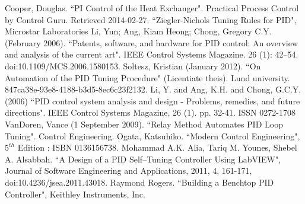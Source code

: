 \begin{thebibliography}{99}
 Cooper, Douglas. ``PI Control of the Heat Exchanger". Practical Process Control by Control Guru. Retrieved 2014-02-27.
 ``Ziegler-Nichols Tuning Rules for PID", Microstar Laboratories
 Li, Yun; Ang, Kiam Heong; Chong, Gregory C.Y. (February 2006). ``Patents, software, and hardware for PID control: An overview and analysis of the current art". IEEE Control Systems Magazine. 26 (1): 42–54. doi:10.1109/MCS.2006.1580153.
 Soltesz, Kristian (January 2012). ``On Automation of the PID Tuning Procedure" (Licentiate theis). Lund university. 847ca38e-93e8-4188-b3d5-8ec6c23f2132.
 Li, Y. and Ang, K.H. and Chong, G.C.Y. (2006) ``PID control system analysis and design - Problems, remedies, and future directions". IEEE Control Systems Magazine, 26 (1). pp. 32-41. ISSN 0272-1708
 VanDoren, Vance (1 September 2009). ``Relay Method Automates PID Loop Tuning". Control Engineering.
 Ogata, Katsuhiko. ``Modern Control Engineering", $5^{th}$ Edition : ISBN 0136156738.
 Mohammad A.K. Alia, Tariq M. Younes, Shebel A. Alsabbah. ``A Design of a PID Self--Tuning Controller Using LabVIEW", Journal of Software Engineering and Applications, 2011, 4, 161-171, doi:10.4236/jsea.2011.43018.
 Raymond Rogers. ``Building a Benchtop PID Controller", Keithley Instruments, Inc.








\end{thebibliography}
